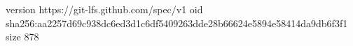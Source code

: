 version https://git-lfs.github.com/spec/v1
oid sha256:aa2257d69c938dc6ed3d1c6df5409263dde28b66624e5894e58414da9db6f3f1
size 878
